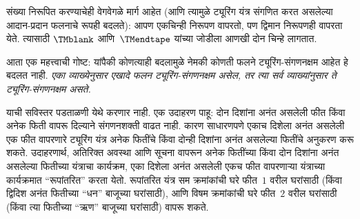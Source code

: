 \documentclass[../../../include/open-logic-section]{subfiles}
\begin{document}
संख्या निरूपित करण्याचेही वेगवेगळे मार्ग आहेत (आणि त्यामुळे
ट्यूरिंग यंत्र संगणित करत असलेल्या आदान-प्रदान फलनाचे रूपही
बदलते): आपण एकचिन्ही निरूपण वापरतो, पण द्विमान निरूपणही
वापरता येते. त्यासाठी $\TMblank$ आणि~$\TMendtape$ यांच्या
जोडीला आणखी दोन चिन्हे लागतात.

आता एक महत्त्वाची गोष्ट: यांपैकी कोणत्याही बदलामुळे नेमकी
कोणती फलने ट्यूरिंग-संगणनक्षम आहेत हे बदलत नाही.
\emph{एका व्याख्येनुसार एखादे फलन ट्यूरिंग-संगणनक्षम असेल,
तर त्या सर्व व्याख्यांनुसार ते ट्यूरिंग-संगणनक्षम असते.}

याची सविस्तर पडताळणी येथे करणार नाही. एक उदाहरण पाहू:
दोन दिशांना अनंत असलेली फीत किंवा अनेक फिती वापरू दिल्याने
संगणनशक्ती वाढत नाही. कारण साधारणपणे एकाच दिशेला अनंत असलेली
एक फीत वापरणारे ट्यूरिंग यंत्र अनेक फितींचे किंवा दोन्ही
दिशांना अनंत असलेल्या फितींचे अनुकरण करू शकते. उदाहरणार्थ,
अतिरिक्त अवस्था आणि सूचना वापरून अनेक फितींच्या किंवा
दोन दिशांना अनंत असलेल्या फितीच्या यंत्राचा कार्यक्रम, एका
दिशेला अनंत असलेली एकच फीत वापरणाऱ्या यंत्राच्या कार्यक्रमात
``रूपांतरित'' करता येतो. रूपांतरित यंत्र सम क्रमांकांची घरे
फीत~$1$ वरील घरांसाठी (किंवा द्विदिश अनंत फितीच्या ``धन''
बाजूच्या घरांसाठी), आणि विषम क्रमांकांची घरे फीत~$2$ वरील
घरांसाठी (किंवा त्या फितीच्या ``ऋण'' बाजूच्या घरांसाठी)
वापरू शकते.
\end{document}
